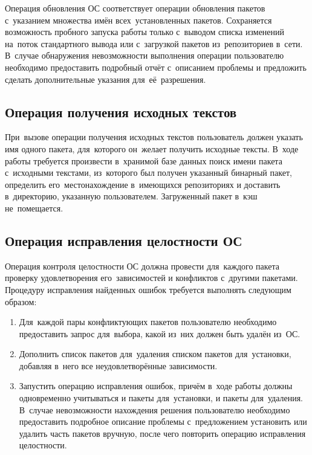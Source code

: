 Операция обновления ОС соответствует операции обновления пакетов с~указанием множества имён всех~установленных пакетов.
Сохраняется возможность пробного запуска работы только с~выводом списка изменений на~поток стандартного вывода или с~загрузкой пакетов из~репозиториев в~сети.
В~случае обнаружения невозможности выполнения операции пользователю необходимо предоставить подробный отчёт с~описанием проблемы и предложить сделать дополнительные указания для~её~разрешения.

\subsection{Операция получения исходных текстов}

При~вызове операции получения исходных текстов пользователь должен указать имя одного пакета,
для~которого он~желает получить исходные тексты.
В~ходе работы требуется произвести в~хранимой базе данных   поиск имени пакета с~исходными текстами,
из~которого был получен указанный бинарный пакет, 
определить его~местонахождение в~имеющихся репозиториях и доставить в~директорию, указанную пользователем.
Загруженный пакет в~кэш не~помещается.

\subsection{Операция исправления целостности ОС}

Операция контроля целостности ОС должна провести для~каждого пакета  проверку удовлетворения его~зависимостей и конфликтов с~другими пакетами.
Процедуру исправления найденных ошибок требуется выполнять следующим образом:

\begin{enumerate}

\item {
Для~каждой пары конфликтующих пакетов пользователю необходимо предоставить запрос для~выбора, 
какой из~них должен быть удалён из~ОС.
}

\item {
Дополнить список пакетов для~удаления списком пакетов для~установки,
добавляя в~него все неудовлетворённые зависимости.
}

\item {
Запустить операцию  исправления ошибок, 
причём в~ходе работы должны одновременно учитываться и пакеты для~установки, и пакеты для~удаления.
В~случае невозможности нахождения решения пользователю необходимо предоставить подробное описание проблемы с~предложением установить или удалить часть пакетов вручную,
после чего повторить операцию исправления целостности.
}

\end{enumerate}

